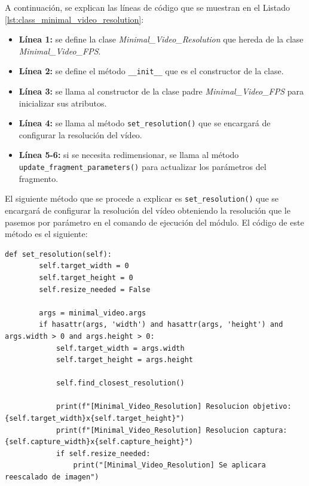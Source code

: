 A continuación, se explican las líneas de código que se muestran en el Listado \ref{lst:class_minimal_video_resolution}:
\begin{itemize}
    \item \textbf{Línea 1:} se define la clase \textit{Minimal\_Video\_Resolution} que hereda de la clase \textit{Minimal\_Video\_FPS}.
    \item \textbf{Línea 2:} se define el método \texttt{\_\_init\_\_} que es el constructor de la clase.
    \item \textbf{Línea 3:} se llama al constructor de la clase padre \textit{Minimal\_Video\_FPS} para inicializar sus atributos.
    \item \textbf{Línea 4:} se llama al método \texttt{set\_resolution()} que se encargará de configurar la resolución del vídeo.
    \item \textbf{Línea 5-6:} si se necesita redimensionar, se llama al método \texttt{update\_fragment\_parameters()} para actualizar los parámetros del fragmento.
\end{itemize}
\vspace{\baselineskip}

El siguiente método que se procede a explicar es \texttt{set\_resolution()} que se encargará de configurar la resolución del vídeo obteniendo la resolución que le pasemos por parámetro en el comando de ejecución del módulo. El código de este método es el siguiente:
\begin{lstlisting}[style=pythonstyle, caption={Método \texttt{set\_resolution()} de \textit{Minimal\_Video\_Resolution}.}, label={lst:set_resolution_minimal_video_resolution}]
def set_resolution(self):
        self.target_width = 0
        self.target_height = 0
        self.resize_needed = False

        args = minimal_video.args
        if hasattr(args, 'width') and hasattr(args, 'height') and args.width > 0 and args.height > 0:
            self.target_width = args.width
            self.target_height = args.height

            self.find_closest_resolution()

            print(f"[Minimal_Video_Resolution] Resolucion objetivo: {self.target_width}x{self.target_height}")
            print(f"[Minimal_Video_Resolution] Resolucion captura: {self.capture_width}x{self.capture_height}")
            if self.resize_needed:
                print("[Minimal_Video_Resolution] Se aplicara reescalado de imagen")
\end{lstlisting}
\vspace{\baselineskip}

